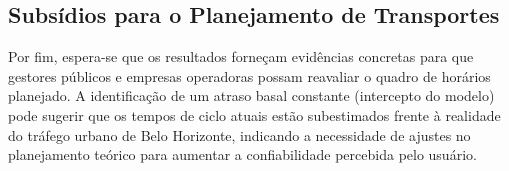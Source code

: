 \subsection{Subsídios para o Planejamento de Transportes}

Por fim, espera-se que os resultados forneçam evidências concretas para que gestores públicos e empresas operadoras possam reavaliar o quadro de horários planejado. A identificação de um atraso basal constante (intercepto do modelo) pode sugerir que os tempos de ciclo atuais estão subestimados frente à realidade do tráfego urbano de Belo Horizonte, indicando a necessidade de ajustes no planejamento teórico para aumentar a confiabilidade percebida pelo usuário.